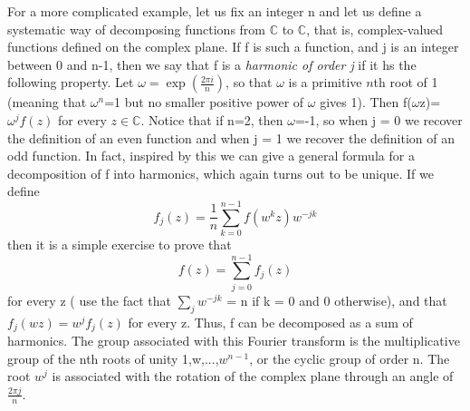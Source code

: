 \documentclass[a4paper,10pt]{article}
\numberwithin{equation}{section}
\numberwithin{figure}{section}
\theoremstyle{plain}
\begin{document}
For a more complicated example, let us fix an integer n and let us define a systematic way of decomposing 
functions from $\mathbb{C}$ to $\mathbb{C}$, that is, complex-valued functions defined on the complex
plane. If f is such a function, and j is an integer between 0 and n-1, then we say that f is a 
\textit{harmonic of order j} if it hs the following property. Let $\omega=\exp(\frac{2\pi i}{n})$, so that $\omega$ is a 
primitive $\textit{n}$th root of 1 (meaning that $\omega^{n}$=1 but no smaller positive power of $\omega$ gives
1). Then f($\omega$z)=$\omega^{j}f(z)$ for every $z\in \mathbb{C}$. Notice that if n=2, then $\omega$=-1,
so when j = 0 we recover the definition of an even function and when j = 1 we recover the definition of an odd
function. In fact, inspired by this we can give a general formula for a decomposition of f into harmonics,
which again turns out to be unique. If we define
\begin{displaymath}
 f_{j}(z)=\frac{1}{n} \sum\limits_{k=0}^{n-1}f(w^{k}z)w^{-jk} %
\end{displaymath}
then it is a simple exercise to prove that
\begin{displaymath}
 f(z) = \sum\limits_{j=0}^{n-1}f_{j}(z)
\end{displaymath}
for every z ( use the fact that $\sum\limits_{j}w^{-jk}$ = n if k = 0 and 0 otherwise), and that 
$f_{j}(wz)=w^{j}f_{j}(z)$ for every z.
Thus, f can be decomposed as a sum of harmonics. The group associated with this Fourier transform
is the multiplicative group of the nth roots of unity 1,w,...,$w^{n-1}$, or the cyclic group of order n.
The root $w^{j}$ is associated with the rotation of the complex plane through an angle of $\frac{2\pi j}{n}$.
\end{document}
